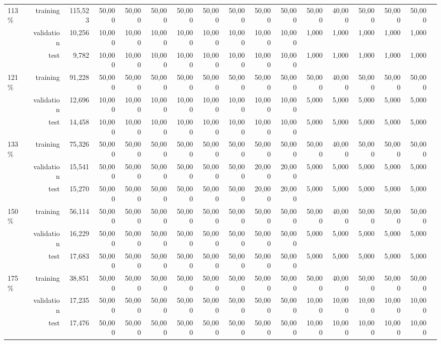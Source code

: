 \begin{table}[!ht]
\begin{adjustbox}{width=\textwidth}
\begin{tabular}{lrrrrrrrrrrrrrrrr}
\multirow{3}{*}{113\%} &training & 115,523 &50,000 &50,000 &50,000 &50,000 &50,000 &50,000 &50,000 &50,000 &50,000 &40,000 &50,000 &50,000 &50,000 \\
&validation & 10,256 &10,000 &10,000 &10,000 &10,000 &10,000 &10,000 &10,000 &10,000 &1,000 &1,000 &1,000 &1,000 &1,000 \\
&test & 9,782 &10,000 &10,000 &10,000 &10,000 &10,000 &10,000 &10,000 &10,000 &1,000 &1,000 &1,000 &1,000 &1,000 \\ \midrule
\multirow{3}{*}{121\%} &training & 91,228 &50,000 &50,000 &50,000 &50,000 &50,000 &50,000 &50,000 &50,000 &50,000 &40,000 &50,000 &50,000 &50,000 \\
&validation & 12,696 &10,000 &10,000 &10,000 &10,000 &10,000 &10,000 &10,000 &10,000 &5,000 &5,000 &5,000 &5,000 &5,000 \\
&test & 14,458 &10,000 &10,000 &10,000 &10,000 &10,000 &10,000 &10,000 &10,000 &5,000 &5,000 &5,000 &5,000 &5,000 \\ \midrule
\multirow{3}{*}{133\%} &training & 75,326 &50,000 &50,000 &50,000 &50,000 &50,000 &50,000 &50,000 &50,000 &50,000 &40,000 &50,000 &50,000 &50,000 \\
&validation & 15,541 &50,000 &50,000 &50,000 &50,000 &50,000 &50,000 &20,000 &20,000 &5,000 &5,000 &5,000 &5,000 &5,000 \\
&test & 15,270 &50,000 &50,000 &50,000 &50,000 &50,000 &50,000 &20,000 &20,000 &5,000 &5,000 &5,000 &5,000 &5,000 \\ \midrule
\multirow{3}{*}{150\%} &training & 56,114 &50,000 &50,000 &50,000 &50,000 &50,000 &50,000 &50,000 &50,000 &50,000 &40,000 &50,000 &50,000 &50,000 \\
&validation & 16,229 &50,000 &50,000 &50,000 &50,000 &50,000 &50,000 &50,000 &50,000 &5,000 &5,000 &5,000 &5,000 &5,000 \\
&test & 17,683 &50,000 &50,000 &50,000 &50,000 &50,000 &50,000 &50,000 &50,000 &5,000 &5,000 &5,000 &5,000 &5,000 \\ \midrule
\multirow{3}{*}{175\%} &training & 38,851 &50,000 &50,000 &50,000 &50,000 &50,000 &50,000 &50,000 &50,000 &50,000 &40,000 &50,000 &50,000 &50,000 \\
&validation & 17,235 &50,000 &50,000 &50,000 &50,000 &50,000 &50,000 &50,000 &50,000 &10,000 &10,000 &10,000 &10,000 &10,000 \\
&test & 17,476 &50,000 &50,000 &50,000 &50,000 &50,000 &50,000 &50,000 &50,000 &10,000 &10,000 &10,000 &10,000 &10,000 \\ \midrule

\end{tabular}
\end{adjustbox}
\end{table}
